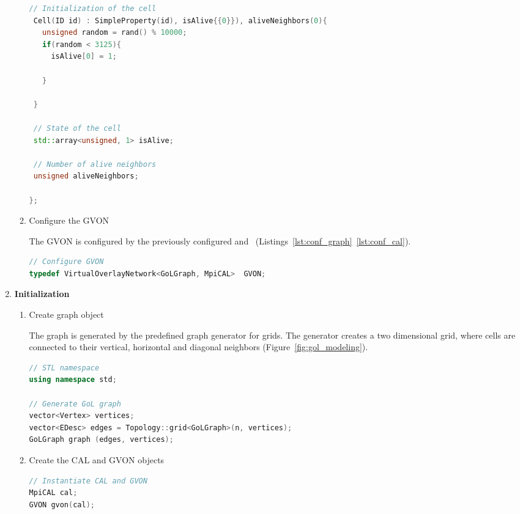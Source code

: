 \begin{enumerate}
\begin{enumerate}
\begin{lstlisting}[language=C++, label=lst:gol_cell, caption={\ }]
 // Initialization of the cell
 Cell(ID id) : SimpleProperty(id), isAlive{{0}}), aliveNeighbors(0){ 
   unsigned random = rand() % 10000;
   if(random < 3125){ 
     isAlive[0] = 1;
     
   }
   
 }

 // State of the cell
 std::array<unsigned, 1> isAlive;

 // Number of alive neighbors
 unsigned aliveNeighbors;
 
};
\end{lstlisting}

\item Configure the GVON

  The GVON is configured by the previously configured 
  and ~(Listings~\ref{lst:conf_graph}~\ref{lst:conf_cal}).

  \begin{lstlisting}[language=C++, label=lst:conf_gvon, caption={}]
// Configure GVON
typedef VirtualOverlayNetwork<GoLGraph, MpiCAL>  GVON;
  \end{lstlisting}

\end{enumerate}

\item \textbf{Initialization}
  \begin{enumerate}
  
  \item Create graph object

    The graph is generated by the predefined graph generator for
    grids. The generator creates a two dimensional grid, where cells
    are connected to their vertical, horizontal and diagonal neighbors
    (Figure~\ref{fig:gol_modeling}).

  \begin{lstlisting}[language=C++, label=lst:gol_generator_graph, caption={}]
// STL namespace
using namespace std;

// Generate GoL graph
vector<Vertex> vertices;
vector<EDesc> edges = Topology::grid<GoLGraph>(n, vertices);
GoLGraph graph (edges, vertices); 
  \end{lstlisting}

\item Create the CAL and GVON objects

  \begin{lstlisting}[language=C++, label=lst:, caption={}]
// Instantiate CAL and GVON
MpiCAL cal;
GVON gvon(cal);
  \end{lstlisting}


\end{enumerate}
\end{enumerate}
